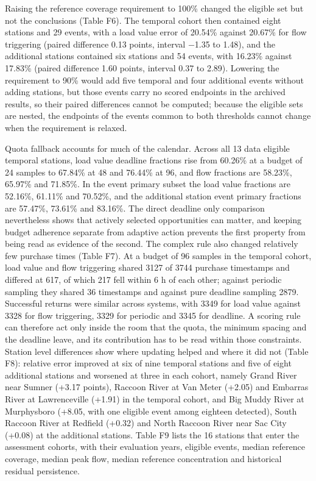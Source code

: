 \documentclass[pdflatex,sn-mathphys-num]{sn-jnl}%
\theoremstyle{thmstyleone}%
\theoremstyle{thmstyletwo}%
\theoremstyle{thmstylethree}%
\begin{document}
Raising the reference coverage requirement to 100\% changed the eligible set but not the conclusions (Table F6). The temporal cohort then contained eight stations and 29 events, with a load value error of 20.54\% against 20.67\% for flow triggering (paired difference 0.13 points, interval $-$1.35 to 1.48), and the additional stations contained six stations and 54 events, with 16.23\% against 17.83\% (paired difference 1.60 points, interval 0.37 to 2.89). Lowering the requirement to 90\% would add five temporal and four additional events without adding stations, but those events carry no scored endpoints in the archived results, so their paired differences cannot be computed; because the eligible sets are nested, the endpoints of the events common to both thresholds cannot change when the requirement is relaxed.

Quota fallback accounts for much of the calendar. Across all 13 data eligible temporal stations, load value deadline fractions rise from 60.26\% at a budget of 24 samples to 67.84\% at 48 and 76.44\% at 96, and flow fractions are 58.23\%, 65.97\% and 71.85\%. In the event primary subset the load value fractions are 52.16\%, 61.11\% and 70.52\%, and the additional station event primary fractions are 57.47\%, 73.61\% and 83.16\%. The direct deadline only comparison nevertheless shows that actively selected opportunities can matter, and keeping budget adherence separate from adaptive action prevents the first property from being read as evidence of the second. The complex rule also changed relatively few purchase times (Table F7). At a budget of 96 samples in the temporal cohort, load value and flow triggering shared 3127 of 3744 purchase timestamps and differed at 617, of which 217 fell within 6 h of each other; against periodic sampling they shared 36 timestamps and against pure deadline sampling 2879. Successful returns were similar across systems, with 3349 for load value against 3328 for flow triggering, 3329 for periodic and 3345 for deadline. A scoring rule can therefore act only inside the room that the quota, the minimum spacing and the deadline leave, and its contribution has to be read within those constraints. Station level differences show where updating helped and where it did not (Table F8): relative error improved at six of nine temporal stations and five of eight additional stations and worsened at three in each cohort, namely Grand River near Sumner (+3.17 points), Raccoon River at Van Meter (+2.05) and Embarras River at Lawrenceville (+1.91) in the temporal cohort, and Big Muddy River at Murphysboro (+8.05, with one eligible event among eighteen detected), South Raccoon River at Redfield (+0.32) and North Raccoon River near Sac City (+0.08) at the additional stations. Table F9 lists the 16 stations that enter the assessment cohorts, with their evaluation years, eligible events, median reference coverage, median peak flow, median reference concentration and historical residual persistence.
\end{document}

